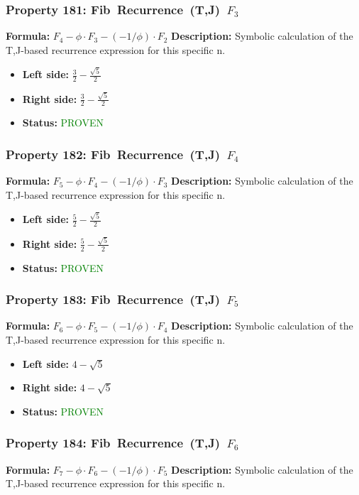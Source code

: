 \subsubsection*{Property 181: Fib~Recurrence~(T,J)~$F_{3}$}
\textbf{Formula:} $F_4-\phi \cdot F_3-(-1/\phi) \cdot F_2$
\textbf{Description:} Symbolic calculation of the T,J-based recurrence expression for this specific n.

\begin{itemize}
\item \textbf{Left side:} $\frac{3}{2} - \frac{\sqrt{5}}{2}$
\item \textbf{Right side:} $\frac{3}{2} - \frac{\sqrt{5}}{2}$
\item \textbf{Status:} \textcolor{green}{PROVEN}
\end{itemize}

\subsubsection*{Property 182: Fib~Recurrence~(T,J)~$F_{4}$}
\textbf{Formula:} $F_5-\phi \cdot F_4-(-1/\phi) \cdot F_3$
\textbf{Description:} Symbolic calculation of the T,J-based recurrence expression for this specific n.

\begin{itemize}
\item \textbf{Left side:} $\frac{5}{2} - \frac{\sqrt{5}}{2}$
\item \textbf{Right side:} $\frac{5}{2} - \frac{\sqrt{5}}{2}$
\item \textbf{Status:} \textcolor{green}{PROVEN}
\end{itemize}

\subsubsection*{Property 183: Fib~Recurrence~(T,J)~$F_{5}$}
\textbf{Formula:} $F_6-\phi \cdot F_5-(-1/\phi) \cdot F_4$
\textbf{Description:} Symbolic calculation of the T,J-based recurrence expression for this specific n.

\begin{itemize}
\item \textbf{Left side:} $4 - \sqrt{5}$
\item \textbf{Right side:} $4 - \sqrt{5}$
\item \textbf{Status:} \textcolor{green}{PROVEN}
\end{itemize}

\subsubsection*{Property 184: Fib~Recurrence~(T,J)~$F_{6}$}
\textbf{Formula:} $F_7-\phi \cdot F_6-(-1/\phi) \cdot F_5$
\textbf{Description:} Symbolic calculation of the T,J-based recurrence expression for this specific n.

